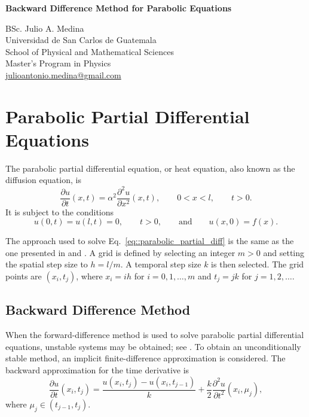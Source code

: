 \documentclass[a4paper]{article}
\begin{document}

\Large
\begin{center}
\textbf{Backward Difference Method for Parabolic Equations}\\

\hspace{10pt}

\large
BSc. Julio A. Medina\\
\hspace{10pt}
\small
Universidad de San Carlos de Guatemala\\
School of Physical and Mathematical Sciences\\
Master's Program in Physics\\
\href{mailto:julioantonio.medina@gmail.com}{julioantonio.medina@gmail.com}\\
\end{center}

\hspace{10pt}

\normalsize
\section{Parabolic Partial Differential Equations}

The parabolic partial differential equation, or heat equation, also known as the diffusion equation, is
\begin{equation}\label{eq::parabolic_partial_diff}
\frac{\partial u}{\partial t}(x,t)=\alpha^2\frac{\partial^2u}{\partial x^2}(x,t),\qquad 0<x<l,\qquad t>0.
\end{equation}
It is subject to the conditions
\begin{equation}
u(0,t)=u(l,t)=0,\qquad t>0,\qquad \text{and}\qquad u(x,0)=f(x).
\end{equation}

The approach used to solve Eq.~\ref{eq::parabolic_partial_diff} is the same as the one presented in \cite{Medina} and \cite{Burden}. A grid is defined by selecting an integer $m>0$ and setting the spatial step size to $h=l/m$. A temporal step size $k$ is then selected. The grid points are $(x_i,t_j)$, where $x_i=ih$ for $i=0,1,\ldots,m$ and $t_j=jk$ for $j=1,2,\ldots$.

\subsection{Backward Difference Method}

When the forward-difference method is used to solve parabolic partial differential equations, unstable systems may be obtained; see \cite{Burden}. To obtain an unconditionally stable method, an implicit finite-difference approximation is considered. The backward approximation for the time derivative is
\begin{equation}\label{eq::implicit_difference}
\frac{\partial u}{\partial t}(x_i,t_j)=\frac{u(x_i,t_j)-u(x_i,t_{j-1})}{k}+\frac{k}{2}\frac{\partial^2u}{\partial t^2}(x_i,\mu_j),
\end{equation}
where $\mu_j\in(t_{j-1},t_j)$.
\end{document}

